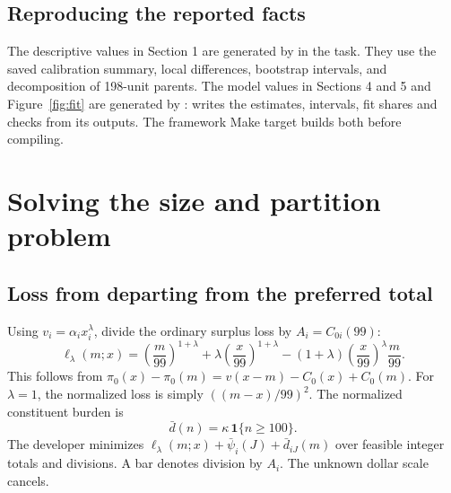 \documentclass[11pt]{article}
\newcommand{\ind}{\mathbf 1}
\begin{document}
\subsection{Reproducing the reported facts}
The descriptive values in Section 1 are generated by
 in the
 task. They use the saved calibration summary, local differences, bootstrap intervals, and decomposition of 198-unit parents. The model values in Sections 4 and 5 and Figure~\ref{fig:fit} are generated by :  writes the estimates, intervals, fit shares and checks from its outputs. The framework Make target builds both before compiling.

\section{Solving the size and partition problem}
\label{app:solution}

\subsection{Loss from departing from the preferred total}
Using $v_i=\alpha_i x_i^\lambda$, divide the ordinary surplus loss by $A_i=C_{0i}(99)$:
\begin{equation}
\ell_\lambda(m;x)
=\left(\frac{m}{99}\right)^{1+\lambda}
+\lambda\left(\frac{x}{99}\right)^{1+\lambda}
-(1+\lambda)\left(\frac{x}{99}\right)^\lambda\frac{m}{99}.
\label{eq:loss}
\end{equation}
This follows from $\pi_0(x)-\pi_0(m)=v(x-m)-C_0(x)+C_0(m)$. For $\lambda=1$, the normalized loss is simply $((m-x)/99)^2$. The normalized constituent burden is
\begin{equation}
\bar d(n)=\kappa\,\ind\{n\ge100\}.
\end{equation}
The developer minimizes $\ell_\lambda(m;x)+\bar\psi_i(J)+\bar d_{iJ}(m)$ over feasible integer totals and divisions. A bar denotes division by $A_i$. The unknown dollar scale cancels.
\end{document}
